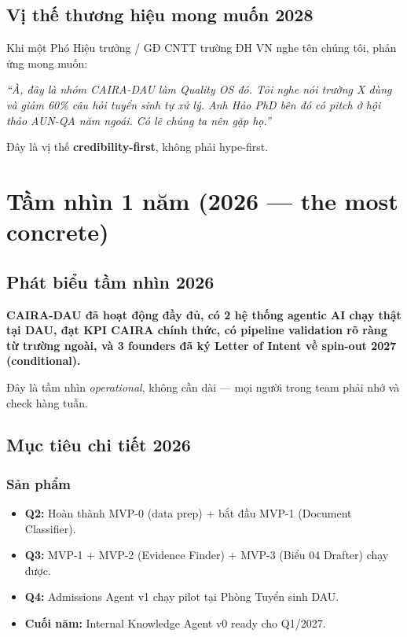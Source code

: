 \documentclass[11pt,a4paper]{article}
\begin{document}
\subsection{Vị thế thương hiệu mong muốn 2028}

Khi một Phó Hiệu trưởng / GĐ CNTT trường ĐH VN nghe tên chúng tôi, phản ứng
mong muốn:

\begin{quotebox}
\textit{``À, đây là nhóm CAIRA-DAU làm Quality OS đó. Tôi nghe nói trường X
dùng và giảm 60\% câu hỏi tuyển sinh tự xử lý. Anh Hảo PhD bên đó có pitch ở
hội thảo AUN-QA năm ngoái. Có lẽ chúng ta nên gặp họ.''}
\end{quotebox}

Đây là vị thế \textbf{credibility-first}, không phải hype-first.

\clearpage

\section{Tầm nhìn 1 năm (2026 --- the most concrete)}

\subsection{Phát biểu tầm nhìn 2026}

\begin{visionbox}[title=Tầm nhìn cuối 2026]
\textbf{CAIRA-DAU đã hoạt động đầy đủ, có 2 hệ thống agentic AI chạy thật tại
DAU, đạt KPI CAIRA chính thức, có pipeline validation rõ ràng từ trường ngoài,
và 3 founders đã ký Letter of Intent về spin-out 2027 (conditional).}
\end{visionbox}

Đây là tầm nhìn \textit{operational}, không cần dài --- mọi người trong team
phải nhớ và check hàng tuần.

\subsection{Mục tiêu chi tiết 2026}

\subsubsection*{Sản phẩm}

\begin{itemize}
\item \textbf{Q2:} Hoàn thành MVP-0 (data prep) + bắt đầu MVP-1 (Document Classifier).
\item \textbf{Q3:} MVP-1 + MVP-2 (Evidence Finder) + MVP-3 (Biểu 04 Drafter) chạy được.
\item \textbf{Q4:} Admissions Agent v1 chạy pilot tại Phòng Tuyển sinh DAU.
\item \textbf{Cuối năm:} Internal Knowledge Agent v0 ready cho Q1/2027.
\end{itemize}
\end{document}
